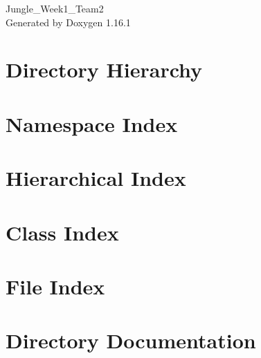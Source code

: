 \documentclass[twoside]{book}
\newcommand{\+}{\discretionary{\mbox{\scriptsize$\hookleftarrow$}}{}{}}
\newcommand{\clearemptydoublepage}{%
    \newpage{\pagestyle{empty}\cleardoublepage}%
  }
\begin{document}
  \raggedbottom
    \hypersetup{pageanchor=false,
                bookmarksnumbered=true,
                pdfencoding=unicode
               }
  \begin{titlepage}
  \vspace*{7cm}
  \begin{center}%
  {\Large Jungle\+\_\+\+Week1\+\_\+\+Team2}\\
  \vspace*{1cm}
  {\large Generated by Doxygen 1.16.1}\\
  \end{center}
  \end{titlepage}
  \clearemptydoublepage
  \tableofcontents
  \clearemptydoublepage
  \hypersetup{pageanchor=true}
\chapter{Directory Hierarchy}

\chapter{Namespace Index}

\chapter{Hierarchical Index}

\chapter{Class Index}

\chapter{File Index}

\chapter{Directory Documentation}











\end{document}
